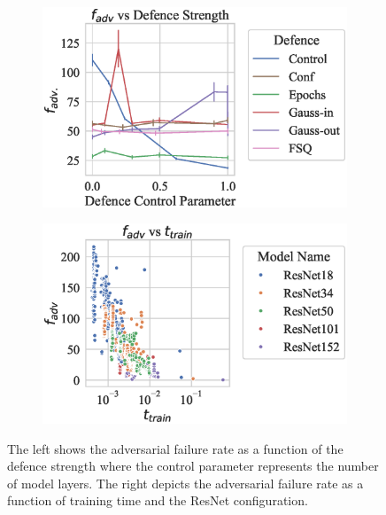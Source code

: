 \begin{figure}[!h]
    \begin{subfigure}
        \centering
        \includegraphics[width=.45\textwidth]{mnist/def_param_vs_adv_failure_rate.eps}
    \end{subfigure}
    \begin{subfigure}
        \centering
        \includegraphics[width=.45\textwidth]{mnist/adv_failure_rate_vs_train_time.eps}
    \end{subfigure}
    \caption{The left shows the adversarial failure rate as a function of the defence strength where the control parameter represents the number of model layers. The right depicts the adversarial failure rate as a function of training time and the ResNet configuration.}
    \label{fig:mnist_failure_rate}
\end{figure}

